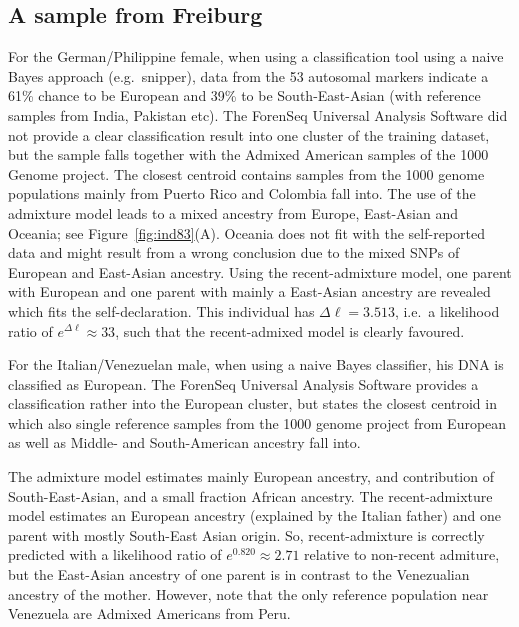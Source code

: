 \documentclass[12pt]{article}
\theoremstyle{definition}
\begin{document}
%   

\subsection{A sample from Freiburg}
For the German/Philippine female, when using a classification tool
using a naive Bayes approach (e.g.\ {\sc snipper}), data from the 53
autosomal markers indicate a 61\% chance to be European and 39\% to be
South-East-Asian (with reference samples from India, Pakistan
etc). The ForenSeq Universal Analysis Software did not provide a clear
classification result into one cluster of the training dataset, but
the sample falls together with the Admixed American samples of the
1000 Genome project. The closest centroid contains samples from the
1000 genome populations mainly from Puerto Rico and Colombia fall
into. The use of the admixture model leads to a mixed ancestry from
Europe, East-Asian and Oceania; see Figure~\ref{fig:ind83}(A). Oceania
does not fit with the self-reported data and might result from a wrong
conclusion due to the mixed SNPs of European and East-Asian
ancestry. Using the recent-admixture model, one parent with European
and one parent with mainly a East-Asian ancestry are revealed which
fits the self-declaration. This individual has $\Delta\ell = 3.513$,
i.e.\ a likelihood ratio of $e^{\Delta\ell} \approx 33$, such that the
recent-admixed model is clearly favoured.

For the Italian/Venezuelan male, when using a naive Bayes classifier,
his DNA is classified as European. The ForenSeq Universal Analysis
Software provides a classification rather into the European cluster,
but states the closest centroid in which also single reference samples
from the 1000 genome project from European as well as Middle- and
South-American ancestry fall into.

The admixture model estimates mainly European ancestry, and
contribution of South-East-Asian, and a small fraction African
ancestry. The recent-admixture model estimates an European ancestry
(explained by the Italian father) and one parent with mostly
South-East Asian origin. So, recent-admixture is correctly predicted
with a likelihood ratio of $e^{0.820} \approx 2.71$ relative to
non-recent admiture, but the East-Asian ancestry of one parent is in
contrast to the Venezualian ancestry of the mother. However, note that
the only reference population near Venezuela are Admixed Americans
from Peru.
\end{document}

